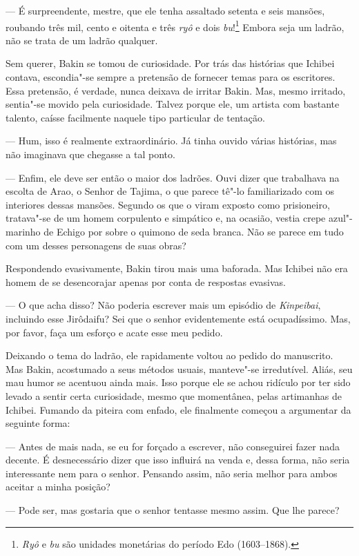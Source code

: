 --- É surpreendente, mestre, que ele tenha assaltado setenta e seis
mansões, roubando três mil, cento e oitenta e três \textit{ryô} e dois
\textit{bu}!\footnote{ \textit{Ryô} e \textit{bu} são unidades monetárias do
período Edo (1603--1868).} Embora seja um ladrão, não se trata de
um ladrão qualquer.

Sem querer, Bakin se tomou de curiosidade. Por trás das histórias que
Ichibei contava, escondia"-se sempre a pretensão de fornecer temas para
os escritores. Essa pretensão, é verdade, nunca deixava de irritar
Bakin. Mas, mesmo irritado, sentia"-se movido pela curiosidade. Talvez
porque ele, um artista com bastante talento, caísse facilmente naquele
tipo particular de tentação.

--- Hum, isso é realmente extraordinário. Já tinha ouvido várias
histórias, mas não imaginava que chegasse a tal ponto.

--- Enfim, ele deve ser então o maior dos ladrões. Ouvi dizer que
trabalhava na escolta de Arao, o Senhor de Tajima, o que parece tê"-lo
familiarizado com os interiores dessas mansões. Segundo os que o viram
exposto como prisioneiro, tratava"-se de um homem corpulento e simpático
e, na ocasião, vestia crepe azul"-marinho de Echigo por sobre o quimono
de seda branca. Não se parece em tudo com um desses personagens de suas
obras?

Respondendo evasivamente, Bakin tirou mais uma baforada. Mas Ichibei não
era homem de se desencorajar apenas por conta de respostas evasivas.

--- O que acha disso? Não poderia escrever mais um episódio de
\textit{Kinpeibai}, incluindo esse Jirôdaifu? Sei que o senhor
evidentemente está ocupadíssimo. Mas, por favor, faça um esforço e
acate esse meu pedido.

Deixando o tema do ladrão, ele rapidamente voltou ao pedido do
manuscrito. Mas Bakin, acostumado a seus métodos usuais, manteve"-se
irredutível. Aliás, seu mau humor se acentuou ainda mais. Isso porque
ele se achou ridículo por ter sido levado a sentir certa curiosidade,
mesmo que momentânea, pelas artimanhas de Ichibei. Fumando da piteira
com enfado, ele finalmente começou a argumentar da seguinte forma:

--- Antes de mais nada, se eu for forçado a escrever, não conseguirei
fazer nada decente. É desnecessário dizer que isso influirá na venda e,
dessa forma, não seria interessante nem para o senhor. Pensando assim,
não seria melhor para ambos aceitar a minha posição?

--- Pode ser, mas gostaria que o senhor tentasse mesmo assim. Que lhe
parece?

